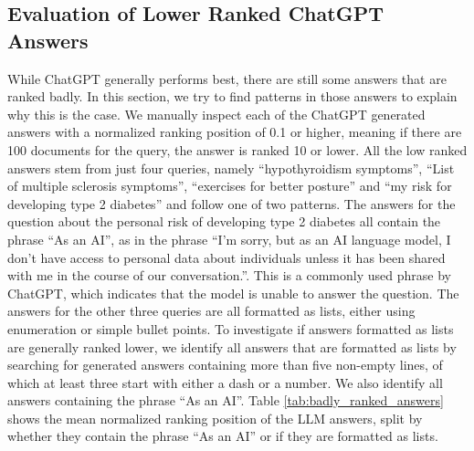 \subsection{Evaluation of Lower Ranked ChatGPT Answers}
While ChatGPT generally performs best, there are still some answers that are ranked badly.
In this section, we try to find patterns in those answers to explain why this is the case.
We manually inspect each of the ChatGPT generated answers with a normalized ranking position of 0.1 or higher, meaning if there are 100 documents for the query, the answer is ranked 10 or lower.
All the low ranked answers stem from just four queries, namely ``hypothyroidism symptoms'', ``List of multiple sclerosis symptoms'',  ``exercises for better posture'' and ``my risk for developing type 2 diabetes'' and follow one of two patterns.
The answers for the question about the personal risk of developing type 2 diabetes all contain the phrase ``As an AI'', as in the phrase ``I'm sorry, but as an AI language model, I don't have access to personal data about individuals unless it has been shared with me in the course of our conversation.''.
This is a commonly used phrase by ChatGPT, which indicates that the model is unable to answer the question.
The answers for the other three queries are all formatted as lists, either using enumeration or simple bullet points.
To investigate if answers formatted as lists are generally ranked lower, we identify all answers that are formatted as lists by searching for generated answers containing more than five non-empty lines, of which at least three start with either a dash or a number.
We also identify all answers containing the phrase ``As an AI''.
Table \ref{tab:badly_ranked_answers} shows the mean normalized ranking position of the LLM answers, split by whether they contain the phrase ``As an AI'' or if they are formatted as lists.
